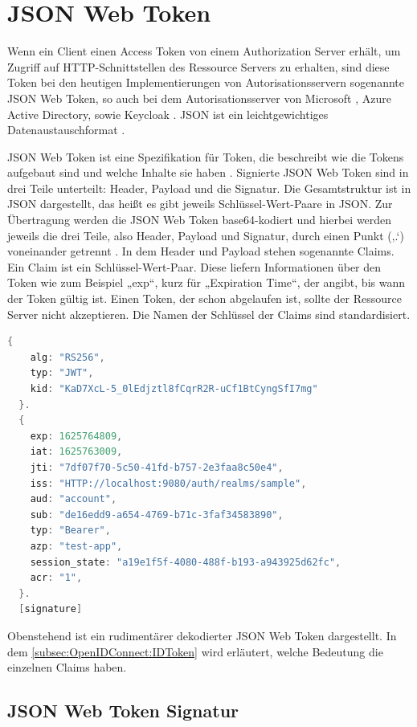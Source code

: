 \section{JSON Web Token}
\label{sec:JSONWebToken}
Wenn ein Client einen Access Token von einem Authorization Server erhält, um Zugriff auf \ac{HTTP}-Schnittstellen des Ressource Servers zu erhalten, sind diese Token bei den heutigen Implementierungen von Autorisationsservern sogenannte \ac{JSON} Web Token, so auch bei dem Autorisationsserver von Microsoft \citep{azuread:2021}, Azure Active Directory, sowie Keycloak \citep{keycloak:2021}. \ac{JSON} ist ein leichtgewichtiges Datenaustauschformat \citep{json:2006}.\smallskip

JSON Web Token ist eine Spezifikation für Token, die beschreibt wie die Tokens aufgebaut sind und welche Inhalte sie haben \citep{jwt:2015}.
Signierte JSON Web Token sind in drei Teile unterteilt: Header, Payload und die Signatur. Die Gesamtstruktur ist in JSON dargestellt, das heißt es gibt jeweils Schlüssel-Wert-Paare in JSON. Zur Übertragung werden die JSON Web Token base64-kodiert und hierbei werden jeweils die drei Teile, also Header, Payload und Signatur, durch einen Punkt (‚.‘) voneinander getrennt \citep{jwt:2015}. 
In dem Header und Payload stehen sogenannte Claims. Ein Claim ist ein Schlüssel-Wert-Paar. Diese liefern Informationen über den Token wie zum Beispiel „exp“, kurz für „Expiration Time“, der angibt, bis wann der Token gültig ist. Einen Token, der schon abgelaufen ist, sollte der Ressource Server nicht akzeptieren. Die Namen der Schlüssel der Claims sind standardisiert. 

\begin{lstlisting}[language=C++,frame=tb,caption={Beispiel JSON Web Token},label=lst:BeispielJSONWebToken]
  {
    alg: "RS256",
    typ: "JWT",
    kid: "KaD7XcL-5_0lEdjztl8fCqrR2R-uCf1BtCyngSfI7mg"
  }.
  {
    exp: 1625764809,
    iat: 1625763009,
    jti: "7df07f70-5c50-41fd-b757-2e3faa8c50e4",
    iss: "HTTP://localhost:9080/auth/realms/sample",
    aud: "account",
    sub: "de16edd9-a654-4769-b71c-3faf34583890",
    typ: "Bearer",
    azp: "test-app",
    session_state: "a19e1f5f-4080-488f-b193-a943925d62fc",
    acr: "1",
  }.
  [signature]   
\end{lstlisting}

Obenstehend ist ein rudimentärer dekodierter JSON Web Token dargestellt. In dem \autoref{subsec:OpenIDConnect:IDToken}
wird erläutert, welche Bedeutung die einzelnen Claims haben.

\subsection{JSON Web Token Signatur}
\label{sec:JSONWebToken:JSONWebTokenSignatur}

